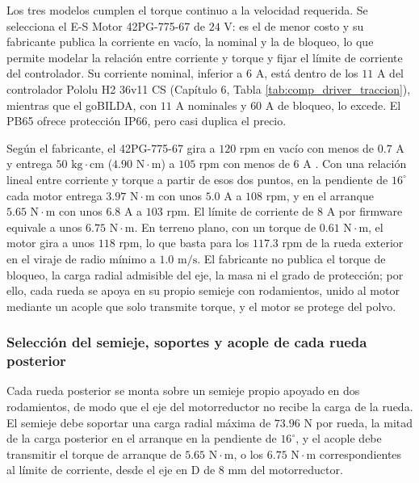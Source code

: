 \documentclass[../../General.tex]{subfiles}
\begin{document}
Los tres modelos cumplen el torque continuo a la velocidad requerida. Se selecciona el E-S Motor 42PG-775-67 de $24\text{ V}$: es el de menor costo y su fabricante publica la corriente en vacío, la nominal y la de bloqueo, lo que permite modelar la relación entre corriente y torque y fijar el límite de corriente del controlador. Su corriente nominal, inferior a $6\text{ A}$, está dentro de los $11\text{ A}$ del controlador Pololu H2 36v11 CS (Capítulo 6, Tabla \ref{tab:comp_driver_traccion}), mientras que el goBILDA, con $11\text{ A}$ nominales y $60\text{ A}$ de bloqueo, lo excede. El PB65 ofrece protección IP66, pero casi duplica el precio.

Según el fabricante, el 42PG-775-67 gira a $120\text{ rpm}$ en vacío con menos de $0.7\text{ A}$ y entrega $50\text{ kg}\cdot\text{cm}$ ($4.90\text{ N}\cdot\text{m}$) a $105\text{ rpm}$ con menos de $6\text{ A}$ \citep{motor_42pg775}. Con una relación lineal entre corriente y torque a partir de esos dos puntos, en la pendiente de $16^\circ$ cada motor entrega $3.97\text{ N}\cdot\text{m}$ con unos $5.0\text{ A}$ a $108\text{ rpm}$, y en el arranque $5.65\text{ N}\cdot\text{m}$ con unos $6.8\text{ A}$ a $103\text{ rpm}$. El límite de corriente de $8\text{ A}$ por firmware equivale a unos $6.75\text{ N}\cdot\text{m}$. En terreno plano, con un torque de $0.61\text{ N}\cdot\text{m}$, el motor gira a unos $118\text{ rpm}$, lo que basta para los $117.3\text{ rpm}$ de la rueda exterior en el viraje de radio mínimo a $1.0\text{ m/s}$. El fabricante no publica el torque de bloqueo, la carga radial admisible del eje, la masa ni el grado de protección; por ello, cada rueda se apoya en su propio semieje con rodamientos, unido al motor mediante un acople que solo transmite torque, y el motor se protege del polvo.

\subsubsection{Selección del semieje, soportes y acople de cada rueda posterior}

Cada rueda posterior se monta sobre un semieje propio apoyado en dos rodamientos, de modo que el eje del motorreductor no recibe la carga de la rueda. El semieje debe soportar una carga radial máxima de $73.96\text{ N}$ por rueda, la mitad de la carga posterior en el arranque en la pendiente de $16^\circ$, y el acople debe transmitir el torque de arranque de $5.65\text{ N}\cdot\text{m}$, o los $6.75\text{ N}\cdot\text{m}$ correspondientes al límite de corriente, desde el eje en D de $8\text{ mm}$ del motorreductor.
\end{document}
